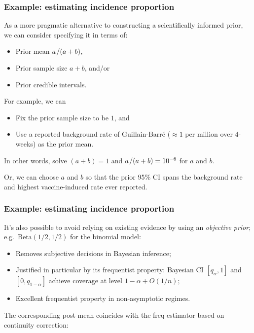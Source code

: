 \documentclass[18pt]{beamer}
\newcommand{\defineTightItemizeSpacing}{%
	\setlength{\abovedisplayskip}{.25\baselineskip}%
	\setlength{\belowdisplayskip}{.25\baselineskip}%
}
\newenvironment{tightEquation*}{%
	\defineTightItemizeSpacing%
	\begin{equation*}
}{
	\end{equation*} \ignorespacesafterend
}
\newenvironment{narrowItemize}[1][]{%
  \vspace{-.3\baselineskip}%
  \begin{itemize}[#1]
  \addtolength\itemsep{-.1\baselineskip}
}{
  \end{itemize}
}
\newcommand{\given}{\thinnerspace | \thinnerspace}
\newcommand{\divby}{\thinnerspace /}
\newcommand{\thinnerspace}{\mskip.5\thinmuskip}
\newcommand{\expectation}{\mathbb{E}}
\newcommand{\betaDist}{\mathrm{Beta}}
\begin{document}
\begin{frame}
\frametitle{Example: estimating incidence proportion}

\vspace*{-.3\baselineskip}
As a more pragmatic alternative to constructing a scientifically informed prior, we can consider specifying it in terms of: 
\vspace*{-.1\baselineskip}
\begin{narrowItemize}
\item Prior mean $a \divby (a + b)$,
\item Prior sample size $a + b$, and/or
\item Prior credible intervals.
\end{narrowItemize}
\vspace*{-.1\baselineskip}

\pause
For example, we can 
\vspace*{-.1\baselineskip}
\begin{narrowItemize}
\item Fix the prior sample size to be $1$, and
\item Use a reported background rate of Guillain-Barré ($\approx 1$ per million over 4-weeks) as the prior mean.
\end{narrowItemize}
\vspace*{-.4\baselineskip}
\pause
In other words, solve $(a + b) = 1$ and $a \divby (a + b) = 10^{-6}$ for $a$ and $b$. %

\pause
\smallskip
Or, we can choose $a$ and $b$ so that the prior 95\% CI spans the background rate and highest vaccine-induced rate ever reported.%

\end{frame}


\begin{frame}
\frametitle{Example: estimating incidence proportion}

It's also possible to avoid relying on existing evidence by using an \textit{objective prior};
e.g.\ $\betaDist(1/2, 1/2)$ for the binomial model:%

\pause%
\begin{narrowItemize}
\item Removes subjective decisions in Bayesian inference; 
\pause
\item Justified in particular by its frequentist property: Bayesian CI $[q_{\alpha}, 1]$ and $[0, q_{1 - \alpha}]$ achieve coverage at level $1 - \alpha + O(1/n)$;
\pause
\item Excellent frequentist property in non-asymptotic regimes.
\end{narrowItemize}

\pause
The corresponding post mean coincides with the freq estimator based on continuity correction:
\end{frame}
\end{document}
